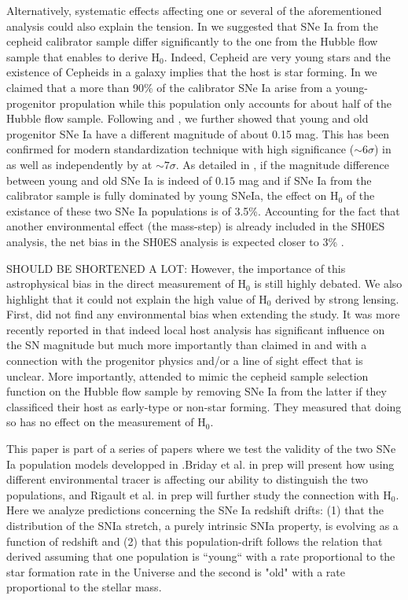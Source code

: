 \documentclass[]{aa} %
\begin{document}
Alternatively, systematic effects affecting one or several of the aforementioned
analysis could also explain the tension. In \cite{rigault2015} we suggested that
SNe Ia from the cepheid calibrator sample differ significantly to the one from
the Hubble flow sample that enables to derive H$_0$. Indeed, Cepheid are very
young stars and the existence of Cepheids in a galaxy implies that the host is
star forming. In \citep{Rigault2015} we claimed that a more than 90\% of the
calibrator SNe Ia arise from a young-progenitor propulation while this
population only accounts for about half of the Hubble flow sample. Following
\cite{sullivan2010} and \citep{rigault2013}, we further showed that young and
old progenitor SNe Ia have a different magnitude of about 0.15 mag. This has
been confirmed for modern standardization technique
\citep[SALT2.4][]{guy2010,betoule2014} with high significance ($\sim 6\sigma$)
in \citep{rigault2018} as well as independently by \cite{roman2019} at $\sim
7\sigma$. As detailed in \citep{Rigault2015}, if the magnitude difference
between young and old SNe Ia is indeed of $0.15$ mag and if SNe Ia from the
calibrator sample is fully dominated by young SNeIa, the effect on H$_0$ of the
existance of these two SNe Ia populations is of 3.5\%. Accounting for the fact
that another environmental effect (the mass-step) is already included in the
SH0ES analysis, the net bias in the SH0ES analysis is expected closer to 3\%
\citep[see table 6 of ][]{rigault2015}. 

SHOULD BE SHORTENED A LOT: However, the importance of this astrophysical bias in
the direct measurement of H$_0$ is still highly debated. We also highlight that
it could not explain the high value of H$_0$ derived by strong lensing. First,
\cite{jones2015} did not find any environmental bias when extending the
\citep{rigault2015} study. It was more recently reported in \citep{jones2019}
that indeed local host analysis has significant influence on the SN magnitude
but much more importantly than claimed in \citep{rigault2018} and with a
connection with the progenitor physics and/or a line of sight effect that is
unclear. More importantly, \cite{riess2016} attended to mimic the cepheid sample
selection function on the Hubble flow sample by removing SNe Ia from the latter
if they classificed their host as early-type or non-star forming. They measured
that doing so has no effect on the measurement of H$_0$.

This paper is part of a series of papers where we test the validity of the two
SNe Ia population models developped in \citep{rigault2018}.Briday et al. in prep
will present how using different environmental tracer is affecting our ability
to distinguish the two populations, and Rigault et al. in prep will further
study the connection with H$_0$. Here we analyze predictions concerning the
SNe Ia redshift drifts: (1) that the distribution of the SNIa stretch, a purely
intrinsic SNIa property, is evolving as a function of redshift and (2) that this
population-drift follows the relation that \citep{rigault2018} derived assuming
that one population is “young“ with a rate proportional to the star formation
rate in the Universe and the second is "old" with a rate proportional to the
stellar mass.
\end{document}
